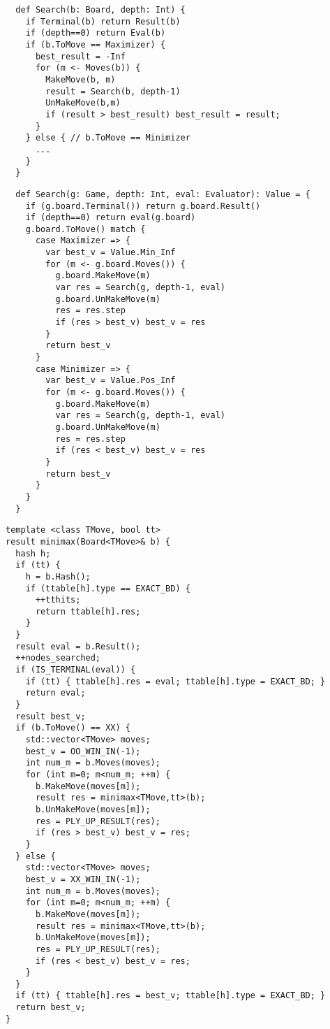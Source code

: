 \documentclass[10pt,dvipdfmx]{report}
\begin{document}
\begin{verbatim}
  def Search(b: Board, depth: Int) {
    if Terminal(b) return Result(b)
    if (depth==0) return Eval(b)
    if (b.ToMove == Maximizer) {
      best_result = -Inf
      for (m <- Moves(b)) {
        MakeMove(b, m)
        result = Search(b, depth-1)
        UnMakeMove(b,m)
        if (result > best_result) best_result = result;
      }
    } else { // b.ToMove == Minimizer
      ...
    }
  }
\end{verbatim}

\begin{verbatim}
  def Search(g: Game, depth: Int, eval: Evaluator): Value = {
    if (g.board.Terminal()) return g.board.Result()
    if (depth==0) return eval(g.board)
    g.board.ToMove() match {
      case Maximizer => {
        var best_v = Value.Min_Inf
        for (m <- g.board.Moves()) {
          g.board.MakeMove(m)
          var res = Search(g, depth-1, eval)
          g.board.UnMakeMove(m)
          res = res.step
          if (res > best_v) best_v = res
        }
        return best_v
      }
      case Minimizer => {
        var best_v = Value.Pos_Inf
        for (m <- g.board.Moves()) {
          g.board.MakeMove(m)
          var res = Search(g, depth-1, eval)
          g.board.UnMakeMove(m)
          res = res.step
          if (res < best_v) best_v = res
        }
        return best_v
      }
    }
  }
\end{verbatim}

\begin{verbatim}
template <class TMove, bool tt>
result minimax(Board<TMove>& b) {
  hash h;
  if (tt) {
    h = b.Hash();
    if (ttable[h].type == EXACT_BD) {
      ++tthits;
      return ttable[h].res;
    }
  }
  result eval = b.Result();
  ++nodes_searched;
  if (IS_TERMINAL(eval)) {
    if (tt) { ttable[h].res = eval; ttable[h].type = EXACT_BD; }
    return eval;
  }
  result best_v;
  if (b.ToMove() == XX) {
    std::vector<TMove> moves;
    best_v = OO_WIN_IN(-1);
    int num_m = b.Moves(moves);
    for (int m=0; m<num_m; ++m) {
      b.MakeMove(moves[m]);
      result res = minimax<TMove,tt>(b);
      b.UnMakeMove(moves[m]);
      res = PLY_UP_RESULT(res);
      if (res > best_v) best_v = res;
    }
  } else {
    std::vector<TMove> moves;
    best_v = XX_WIN_IN(-1);
    int num_m = b.Moves(moves);
    for (int m=0; m<num_m; ++m) {
      b.MakeMove(moves[m]);
      result res = minimax<TMove,tt>(b);
      b.UnMakeMove(moves[m]);
      res = PLY_UP_RESULT(res);
      if (res < best_v) best_v = res;
    }
  }
  if (tt) { ttable[h].res = best_v; ttable[h].type = EXACT_BD; }
  return best_v;
}
\end{verbatim}
\end{document}
